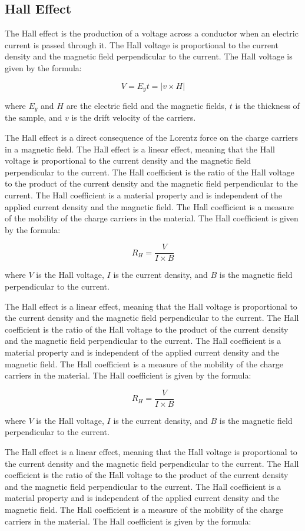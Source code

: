 	\subsection{Hall Effect}
		The Hall effect is the production of a voltage across a conductor when an electric current is passed through it. The Hall voltage is proportional to the current density and the magnetic field perpendicular to the current. The Hall voltage is given by the formula:
		
		$$V = E_yt = |v\times H|$$

		where $E_y$ and $H$ are the electric field and the magnetic fields, $t$ is the thickness of the sample, and $v$ is the drift velocity of the carriers.

		The Hall effect is a direct consequence of the Lorentz force on the charge carriers in a magnetic field. The Hall effect is a linear effect, meaning that the Hall voltage is proportional to the current density and the magnetic field perpendicular to the current. The Hall coefficient is the ratio of the Hall voltage to the product of the current density and the magnetic field perpendicular to the current. The Hall coefficient is a material property and is independent of the applied current density and the magnetic field. The Hall coefficient is a measure of the mobility of the charge carriers in the material. The Hall coefficient is given by the formula:
		
		$$R_H = \frac{V}{I\times B}$$

		where $V$ is the Hall voltage, $I$ is the current density, and $B$ is the magnetic field perpendicular to the current.

		The Hall effect is a linear effect, meaning that the Hall voltage is proportional to the current density and the magnetic field perpendicular to the current. The Hall coefficient is the ratio of the Hall voltage to the product of the current density and the magnetic field perpendicular to the current. The Hall coefficient is a material property and is independent of the applied current density and the magnetic field. The Hall coefficient is a measure of the mobility of the charge carriers in the material. The Hall coefficient is given by the formula:
		
		$$R_H = \frac{V}{I\times B}$$

		where $V$ is the Hall voltage, $I$ is the current density, and $B$ is the magnetic field perpendicular to the current.

		The Hall effect is a linear effect, meaning that the Hall voltage is proportional to the current density and the magnetic field perpendicular to the current. The Hall coefficient is the ratio of the Hall voltage to the product of the current density and the magnetic field perpendicular to the current. The Hall coefficient is a material property and is independent of the applied current density and the magnetic field. The Hall coefficient is a measure of the mobility of the charge carriers in the material. The Hall coefficient is given by the formula: